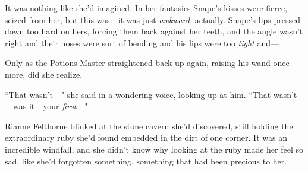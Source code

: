 It was nothing like she'd imagined. In her fantasies Snape's kisses were fierce, seized from her, but this was—it was just \emph{awkward}, actually. Snape's lips pressed down too hard on hers, forcing them back against her teeth, and the angle wasn't right and their noses were sort of bending and his lips were too \emph{tight} and—

Only as the Potions Master straightened back up again, raising his wand once more, did she realize.

``That wasn't—" she said in a wondering voice, looking up at him. ``That wasn't—was it—your \emph{first}—"

Rianne Felthorne blinked at the stone cavern she'd discovered, still holding the extraordinary ruby she'd found embedded in the dirt of one corner. It was an incredible windfall, and she didn't know why looking at the ruby made her feel so sad, like she'd forgotten something, something that had been precious to her.

